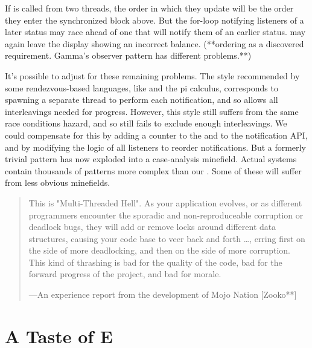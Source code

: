 \documentclass{llncs}
\begin{document}
If  is called from two threads, the order in which
they update  will be the order they enter the
synchronized block above. But the for-loop notifying listeners of a
later status may race ahead of one that will notify them of an earlier
status.  may again leave the display showing an incorrect
balance. (**ordering as a discovered requirement. Gamma's observer
pattern has different problems.**)

It's possible to adjust for these remaining problems. The style
recommended by some rendezvous-based languages, like  and the pi calculus, corresponds to spawning a separate thread to
perform each notification, and so allows all interleavings needed for
progress. However, this style still suffers from the same race
conditions hazard, and so still fails to exclude enough
interleavings. We could compensate for this by adding a counter to the
 and to the notification API, and by modifying the
logic of all listeners to reorder notifications. But a formerly
trivial pattern has now exploded into a case-analysis
minefield. Actual systems contain thousands of patterns more complex
than our . Some of these will suffer from less
obvious minefields.

\begin{quotation}
This is "Multi-Threaded Hell". As your application evolves, or as
different programmers encounter the sporadic and non-reproduceable
corruption or deadlock bugs, they will add or remove locks around
different data structures, causing your code base to veer back and
forth \ldots, erring first on the side of more deadlocking, and then
on the side of more corruption. This kind of thrashing is bad for the
quality of the code, bad for the forward progress of the project, and
bad for morale.

\begin{flushright}
---An experience report from the development of Mojo Nation [Zooko**]
\end{flushright}
\end{quotation}

\section{A Taste of E}
\end{document}
